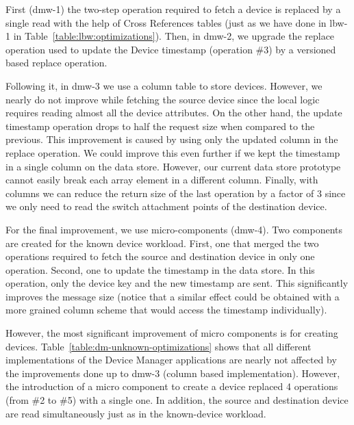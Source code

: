 First  (dmw-1) the two-step operation required to fetch a device is replaced by a single read  with the help of Cross References tables (just as we have done in lbw-1 in Table~\ref{table:lbw:optimizations}). 
Then, in dmw-2, we upgrade  the replace operation used to update the Device timestamp (operation \#3) by a versioned based replace operation. 

Following it, in dmw-3 we use a column table to store devices.  
However,  we nearly do not improve  while fetching the source device since the local logic requires reading almost all the device attributes. 
On the other hand, the update timestamp operation drops to half the request size when compared to the previous.  
This improvement is caused by using only the updated column in the replace operation. 
We could improve this even further if we kept the timestamp in a single column on the data store. 
However, our current data store prototype cannot easily break each array element in a different column. 
Finally,  with columns we can reduce the return size of the last operation by a factor of 3 since we only need to read the switch attachment points of the destination device. 

For the final improvement, we use micro-components (dmw-4).  Two components are created for the known device workload. 
First, one that merged the two operations required to fetch the source and destination device in only one operation.
Second, one to update the timestamp in the data store.  In this operation,  only the device key and the new timestamp are sent. This  significantly improves the message size (notice that a similar effect could be obtained with a more grained column scheme that would access the timestamp individually). 

However,  the most significant improvement of micro components is for creating devices. Table~\ref{table:dm-unknown-optimizations} shows that all different implementations of the Device Manager applications are nearly not affected by the improvements  done up to dmw-3 (column based implementation). However, the introduction of a micro component to create a device replaced  4 operations (from \#2 to \#5) with a single one.  In addition, the source and destination device are read simultaneously just as in the known-device workload. 

